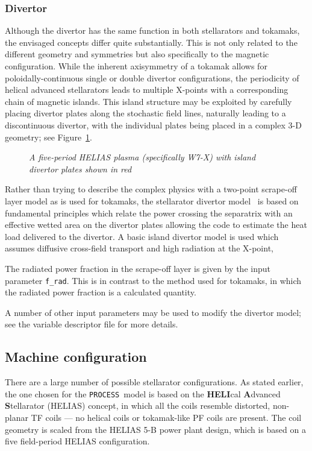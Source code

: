\documentclass[11pt,a4paper]{report}
\newcommand{\process}{\mbox{\texttt{PROCESS}}}
\begin{document}
\subsubsection{Divertor}

Although the divertor has the same function in both stellarators and tokamaks,
the envisaged concepts differ quite substantially. This is not only related to
the different geometry and symmetries but also specifically to the magnetic
configuration. While the inherent axisymmetry of a tokamak allows for
poloidally-continuous single or double divertor configurations, the
periodicity of helical advanced stellarators leads to multiple X-points with a
corresponding chain of magnetic islands. This island structure may be
exploited by carefully placing divertor plates along the stochastic field
lines, naturally leading to a discontinuous divertor, with the individual
plates being placed in a complex 3-D geometry; see Figure~\ref{fig:stelldiv}.

\begin{figure}[tbph]
\centerline{}
\caption[Stellarator island divertor configuration]
{\label{fig:stelldiv}
  \textit{A five-period HELIAS plasma (specifically W7-X) with island divertor
    plates shown in red}
}
\end{figure}

Rather than trying to describe the complex physics with a two-point scrape-off
layer model as is used for tokamaks, the stellarator divertor
model~\cite{stell_divertor} is based on fundamental principles which relate
the power crossing the separatrix with an effective wetted area on the
divertor plates allowing the code to estimate the heat load delivered to the
divertor. A basic island divertor model is used which assumes diffusive
cross-field transport and high radiation at the X-point,

The radiated power fraction in the scrape-off layer is given by the input
parameter \texttt{f\_rad}. This is in contrast to the method used for
tokamaks, in which the radiated power fraction is a calculated quantity.

A number of other input parameters may be used to modify the divertor model;
see the variable descriptor file for more details.

\subsection{Machine configuration}

There are a large number of possible stellarator configurations. As stated
earlier, the one chosen for the \process\ model is based on the
\textbf{HELI}cal \textbf{A}dvanced \textbf{S}tellarator (HELIAS) concept, in
which all the coils resemble distorted, non-planar TF coils --- no helical
coils or tokamak-like PF coils are present.  The coil geometry is scaled from
the HELIAS 5-B power plant design, which is based on a five field-period
HELIAS configuration.
\end{document}
